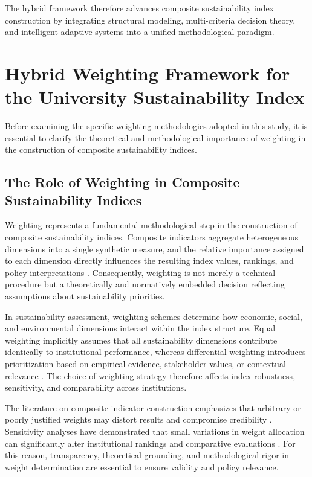 \documentclass[11pt,a4paper]{article}
\begin{document}
The hybrid framework therefore advances composite sustainability index construction by integrating structural modeling, multi-criteria decision theory, and intelligent adaptive systems into a unified methodological paradigm.




\section{Hybrid Weighting Framework for the University Sustainability Index}
Before examining the specific weighting methodologies adopted in this study, it is essential to clarify the theoretical and methodological importance of weighting in the construction of composite sustainability indices.

\subsection{The Role of Weighting in Composite Sustainability Indices}

Weighting represents a fundamental methodological step in the construction of composite sustainability indices. Composite indicators aggregate heterogeneous dimensions into a single synthetic measure, and the relative importance assigned to each dimension directly influences the resulting index values, rankings, and policy interpretations \cite{Nardo2008,Saisana2005,OECD2008}. Consequently, weighting is not merely a technical procedure but a theoretically and normatively embedded decision reflecting assumptions about sustainability priorities.

In sustainability assessment, weighting schemes determine how economic, social, and environmental dimensions interact within the index structure. Equal weighting implicitly assumes that all sustainability dimensions contribute identically to institutional performance, whereas differential weighting introduces prioritization based on empirical evidence, stakeholder values, or contextual relevance \cite{Saltelli2007}. The choice of weighting strategy therefore affects index robustness, sensitivity, and comparability across institutions.

The literature on composite indicator construction emphasizes that arbitrary or poorly justified weights may distort results and compromise credibility \cite{Nardo2008}. Sensitivity analyses have demonstrated that small variations in weight allocation can significantly alter institutional rankings and comparative evaluations \cite{Saisana2005,Greco2019}. For this reason, transparency, theoretical grounding, and methodological rigor in weight determination are essential to ensure validity and policy relevance.
\end{document}
